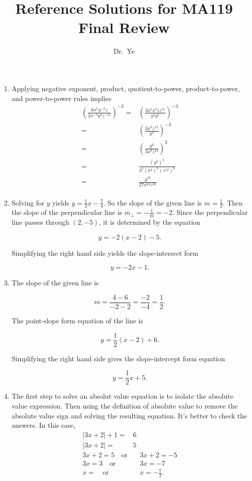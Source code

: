 \documentclass[
  12pt]{article}
\title{Reference Solutions for MA119 Final Review}
\author{Dr.~Ye}
\date{}
\begin{document}
\maketitle
\ifdefined\Shaded\renewenvironment{Shaded}{\begin{tcolorbox}[enhanced, borderline west={3pt}{0pt}{shadecolor}, interior hidden, sharp corners, boxrule=0pt, frame hidden, breakable]}{\end{tcolorbox}}\fi

\begin{enumerate}
\def\labelenumi{\arabic{enumi}.}
\item
  Applying negative exponent, product, quotient-to-power,
  product-to-power, and power-to-power rules implies \[
   \begin{aligned}
   \left(\frac{6x^5y^{-2}z}{2x^{-3}y^4z^{-11}}\right)^{-3}=&\left(\frac{3x^5x^3zz^{11}}{y^4y^2}\right)^{-3}\\
   =&\left(\frac{3x^8z^{12}}{y^6}\right)^{-3}\\
   =&\left(\frac{y^6}{3x^8z^{12}}\right)^3\\
   =&\frac{(y^6)^3}{3^3(x^8)^3(z^{12})^3}\\
   =&\frac{y^{18}}{27x^{24}z^{36}}\\
   \end{aligned}
   \]
\item
  Solving for \(y\) yields \(y=\frac12x-\frac74\). So the slope of the
  given line is \(m=\frac12\). Then the slope of the perpendicular line
  is \(m_\perp=-\frac1m=-2\). Since the perpendicular line passes
  through \((2,-5)\), it is determined by the equation

  \[y=-2(x-2)-5.\]

  Simplifying the right hand side yields the slope-intersect form

  \[y=-2x-1.\]
\item
  The slope of the given line is

  \[m=\frac{4-6}{-2-2}=\frac{-2}{-4}=\frac12.\]

  The point-slope form equation of the line is

  \[y=\frac12(x-2)+6.\]

  Simplifying the right hand side gives the slope-intercept form
  equation

  \[y=\frac12x+5.\]
\item
  The first step to solve an absolut value equation is to isolate the
  absolute value expression. Then using the definition of absolute value
  to remove the absolute value sign and solving the resulting equation.
  It's better to check the answers. In this case, \[
   \begin{aligned}
   |3x+2|+1=&6\\
   |3x+2|=&5\\
   3x+2=5\quad\text{or}&\quad 3x+2=-5\\
   3x=3\quad\text{or}&\quad 3x=-7\\
   x=\quad\text{or}&\quad x=-\frac73.
   \end{aligned}
   \]


\end{enumerate}
\end{document}
